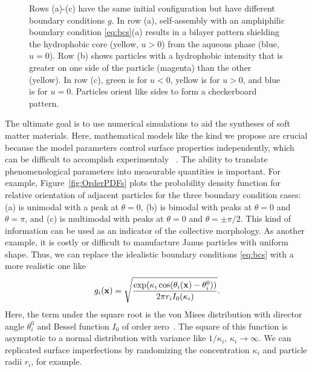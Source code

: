 \begin{figure}[h!]
{    Rows (a)-(c) have the same initial configuration
    but have different boundary conditions $g.$ 
    In row (a), self-assembly with an amphiphilic boundary
    condition \eqref{eq:bcs}(a) results in a bilayer pattern shielding
    the hydrophobic core (yellow, $u > 0$) from the aqueous phase (blue, $u = 0$).
    Row (b) shows particles with a hydrophobic intensity that is
    greater on one side of the particle (magenta) than the other (yellow).
    In row (c), green is for $u < 0$, yellow is for $u > 0$, and blue is for $u = 0$.
    Particles orient like sides to form a checkerboard pattern.\\
  }
\end{figure}

The ultimate goal is to use numerical simulations to aid
the syntheses of soft matter materials.
Here, mathematical models like the kind we propose are crucial
because the model parameters control surface properties independently, 
which can be difficult to accomplish experimentaly 
~\cite{Bradley2016,Mallory2017,Bradley2017}.
The ability to translate phenomenological parameters
into measurable quantities is important. 
For example, Figure~\ref{fig:OrderPDFs} plots
the probability density function for 
relative orientation of adjacent particles
for the three boundary condition cases:
(a) is unimodal with a peak at $\theta = 0$,
(b) is bimodal with peaks at $\theta = 0$ and $\theta = \pi$,
and (c) is multimodal with peaks at $\theta = 0$ and $\theta = \pm \pi/2$.
This kind of information can be used as an indicator
of the collective morphology. As another example,
it is costly or difficult to manufacture
Janus particles with uniform shape.
Thus, we can replace the idealistic boundary
conditions \eqref{eq:bcs} with a more realistic one like
\begin{equation}
\label{eq:vonMises}
  g_i(\mathbf{x}) = \sqrt{
  \frac{\exp( \kappa_i\cos(\theta_i(\mathbf{x}) - \theta^0_i))}
  {2\pi r_i I_0(\kappa_i)}}.
\end{equation}
Here, the term under the square root is the von Mises distribution with
director angle $\theta^0_i$ and Bessel function $I_0$ of order zero~\cite{Fisher_1993}.
The square of this function is asymptotic to a normal distribution with variance
like $1/\kappa_i$, $\kappa_i \to \infty$. We can replicated surface imperfections
by randomizing the concentration $\kappa_i$ and particle radii $r_i$,
for example.


